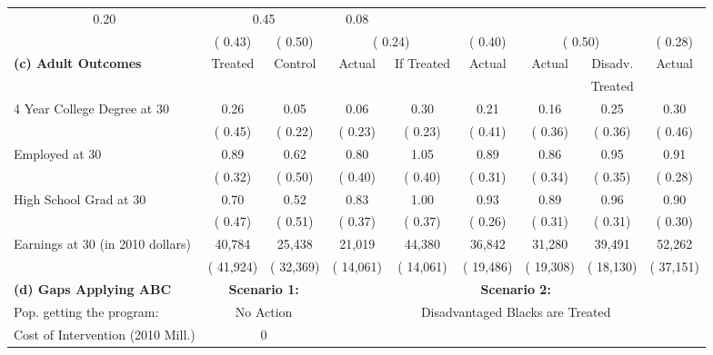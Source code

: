 \begin{table}[htbp]
\begin{center}
\begin{tabular}{lcccccccc}
\multicolumn{1}{c}{         0.20} &
\multicolumn{2}{c}{         0.45} &
\multicolumn{1}{c}{         0.08} 
 \\[0.05cm]  
 & (        0.43) & (        0.50) & \multicolumn{2}{c}{(        0.24)} &
\multicolumn{1}{c}{(        0.40)} &
\multicolumn{2}{c}{(        0.50)} &
\multicolumn{1}{c}{(        0.28)} 
 \\[0.2cm]  
\hline
\textbf{(c) Adult Outcomes} &Treated &Control  &Actual &If Treated &Actual &Actual &Disadv. &Actual \\[0.02cm] 
 & &  && & & & Treated & \\[0.2cm] 
4 Year College Degree at 30 &         0.26 &         0.05 &         0.06 &         0.30 &         0.21 &         0.16 &         0.25 &         0.30 \\[0.05cm]  
 & (        0.45) & (        0.22) & (        0.23) & (        0.23) & (        0.41) & (        0.36) & (        0.36) & (        0.46)   \\[0.2cm]  
Employed at 30 &         0.89 &         0.62 &         0.80 &         1.05 &         0.89 &         0.86 &         0.95 &         0.91 \\[0.05cm]  
 & (        0.32) & (        0.50) & (        0.40) & (        0.40) & (        0.31) & (        0.34) & (        0.35) & (        0.28)   \\[0.2cm]  
High School Grad at 30 &         0.70 &         0.52 &         0.83 &         1.00 &         0.93 &         0.89 &         0.96 &         0.90 \\[0.05cm]  
 & (        0.47) & (        0.51) & (        0.37) & (        0.37) & (        0.26) & (        0.31) & (        0.31) & (        0.30)   \\[0.2cm]  
Earnings at 30 (in 2010 dollars) &       40,784 &       25,438 &       21,019 &       44,380 &       36,842 &       31,280 &       39,491 &       52,262 \\[0.05cm]  
 & (      41,924) & (      32,369) & (      14,061) & (      14,061) & (      19,486) & (      19,308) & (      18,130) & (      37,151)   \\[0.2cm]  
\hline \hline
\textbf{(d) Gaps Applying ABC} & \multicolumn{2}{c}{\textbf{Scenario 1:}} &  &\multicolumn{4}{c}{\textbf{Scenario 2:}}   \\[0.2cm]  
 Pop. getting the program: & \multicolumn{2}{c}{No Action}   &  &\multicolumn{4}{c}{Disadvantaged Blacks are Treated}   \\[0.02cm]  
Cost of Intervention (2010 Mill.) &\multicolumn{2}{c}{ 0 } &

\end{tabular}
\end{center}
\end{table}
